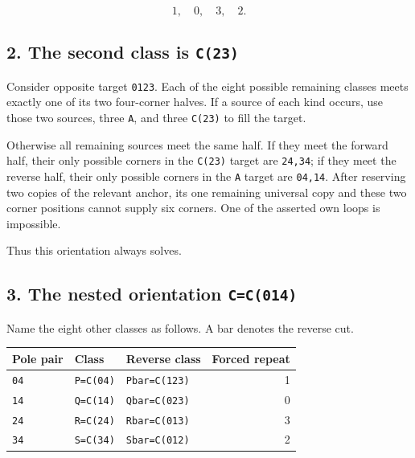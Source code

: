 \documentclass[
  10pt,
]{article}
\begin{document}
\[
1,\quad0,\quad3,\quad2.
\]

\hypertarget{the-second-class-is-c23}{%
\subsection*{\texorpdfstring{2. The second class is
\texttt{C(23)}}{2. The second class is C(23)}}\label{the-second-class-is-c23}}

Consider opposite target \texttt{01\textbar{}23}. Each of the eight
possible remaining classes meets exactly one of its two four-corner
halves. If a source of each kind occurs, use those two sources, three
\texttt{A}, and three \texttt{C(23)} to fill the target.

Otherwise all remaining sources meet the same half. If they meet the
forward half, their only possible corners in the \texttt{C(23)} target
are \texttt{24,34}; if they meet the reverse half, their only possible
corners in the \texttt{A} target are \texttt{04,14}. After reserving two
copies of the relevant anchor, its one remaining universal copy and
these two corner positions cannot supply six corners. One of the
asserted own loops is impossible.

Thus this orientation always solves.

\hypertarget{the-nested-orientation-cc014}{%
\subsection*{\texorpdfstring{3. The nested orientation
\texttt{C=C(014)}}{3. The nested orientation C=C(014)}}\label{the-nested-orientation-cc014}}

Name the eight other classes as follows. A bar denotes the reverse cut.

\begin{longtable}[]{@{}lllr@{}}
\toprule\noalign{}
Pole pair & Class & Reverse class & Forced repeat \\
\midrule\noalign{}
\endhead
\bottomrule\noalign{}
\endlastfoot
\texttt{04} & \texttt{P=C(04)} & \texttt{Pbar=C(123)} & 1 \\
\texttt{14} & \texttt{Q=C(14)} & \texttt{Qbar=C(023)} & 0 \\
\texttt{24} & \texttt{R=C(24)} & \texttt{Rbar=C(013)} & 3 \\
\texttt{34} & \texttt{S=C(34)} & \texttt{Sbar=C(012)} & 2 \\
\end{longtable}
\end{document}
